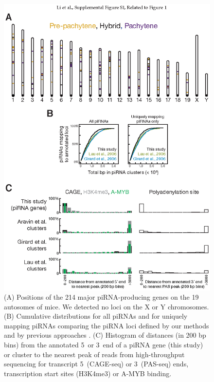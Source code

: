     \begin{figure} %
      \centering 
      \includegraphics{Figures/MolCel/MolCel2013_FigS1.eps}
      \caption[The Major piRNA-Producing Genes of the Post-Partum Mouse Testis]
      {
        (A) Positions of the 214 major piRNA-producing genes on the 19 autosomes of mice. We detected no loci on the X or Y chromosomes. (B) Cumulative distributions for all piRNAs and for uniquely mapping piRNAs comparing the piRNA loci defined by our methods and by previous approaches \citep{Girard2006, Lau2006}. (C) Histogram of distances (in 200 bp bins) from the annotated 5\textprime~or 3\textprime~end of a piRNA gene (this study) or cluster to the nearest peak of reads from high-throughput sequencing for transcript 5\textprime~(CAGE-seq) or 3\textprime~(PAS-seq) ends, transcription start sites (H3K4me3) or A-MYB binding.
        }
      \label{MolCel:fig:MolCelS1}
        \end{figure}

